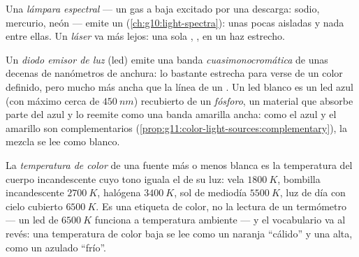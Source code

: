 \begin{definition}\label{def:g11:color-light-sources:lamps}
Una \emph{lámpara espectral} --- un gas a baja
 excitado por una descarga: sodio, mercurio, neón --- emite un
 (\cref{ch:g10:light-spectra}): unas pocas  aisladas y nada entre ellas. Un \emph{láser} va más
lejos: una sola , , en un haz estrecho.
\end{definition}

\begin{definition}\label{def:g11:color-light-sources:led}
Un \emph{diodo emisor de luz} (led) emite una
banda \emph{cuasimonocromática} de unas
decenas de nanómetros de anchura: lo bastante estrecha para verse de un
color definido, pero mucho más ancha que la línea de un . Un led
blanco es un led azul (con máximo cerca de $\qty{450}{nm}$) recubierto
de un \emph{fósforo}, un material que absorbe parte del
azul y lo reemite como una banda amarilla ancha: como el azul y el
amarillo son complementarios
(\cref{prop:g11:color-light-sources:complementary}), la mezcla se lee
como blanco.
\end{definition}

\begin{definition}\label{def:g11:color-light-sources:colortemp}
La \emph{temperatura de color} de una fuente
más o menos blanca es la temperatura del cuerpo incandescente cuyo tono
iguala el de su luz: vela $\qty{1800}{K}$, bombilla incandescente
$\qty{2700}{K}$, halógena $\qty{3400}{K}$, sol de mediodía
$\qty{5500}{K}$, luz de día con cielo cubierto $\qty{6500}{K}$. Es una
etiqueta de color, no la lectura de un termómetro --- un led de
$\qty{6500}{K}$ funciona a temperatura ambiente --- y el vocabulario va
al revés: una temperatura de color baja se lee como un naranja
``cálido'' y una alta, como un azulado ``frío''.
\end{definition}

